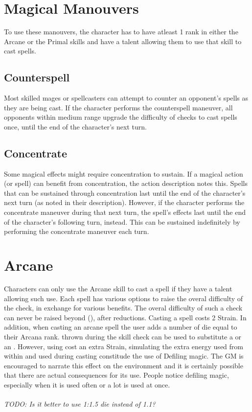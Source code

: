 \begin{multicols}{2}

\section{Magical Manouvers}
To use these manouvers, the character has to have atleast 1 rank in either
the Arcane or the Primal skills and have a talent allowing them to use that
skill to cast spells.

\subsection{Counterspell}
Most skilled mages or spellcasters can attempt to counter an opponent’s spells
as they are being cast. If the character performs the counterspell maneuver,
all opponents within medium range upgrade the difficulty of checks to cast
spells once, until the end of the character's next turn.

\subsection{Concentrate}
Some magical effects might require concentration to sustain. If a magical action
(or spell) can benefit from concentration, the action description notes this.
Spells that can be sustained through concentration last until the end of the
character's next turn (as noted in their description). However, if the character
performs the concentrate maneuver during that next turn, the spell’s effects last
until the end of the character’s following turn, instead. This can be sustained
indefinitely by performing the concentrate maneuver each turn.

\section{Arcane}
Characters can only use the Arcane skill to cast a spell if they have a talent
allowing such use. Each spell has various options to raise the overal difficulty
of the check, in exchange for various benefits. The overal difficulty of
such a check can never be raised beyond (\difficulty\difficulty\difficulty\difficulty\difficulty),
after reductions. Casting a spell costs 2 Strain. In addition, when casting an
arcane spell the user adds a number of \force die equal to their Arcana rank.
\darklight thrown during the skill check can be used to substitute a \success or
an \advantage. However, using \light cost an extra Strain, simulating the
extra energy used from within and \dark used during casting constitude the use
of Defiling magic. The GM is encouraged to narrate this effect on the environment
and it is certainly possible that there are actual consequences for its use. People
notice defiling magic, especially when it is used often or a lot \darklight is used at
once.\\
\\
\textit{TODO: Is it better to use 1:1.5 \force die instead of 1.1?}


\end{multicols}
